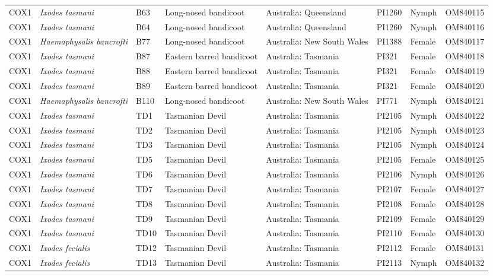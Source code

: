 \documentclass[a4paper, nobind]{templates/ociamthesis}
\begin{document}
\begin{landscape}
\begin{longtable}[t]{l>{}lllllll}
COX1 & \em{Ixodes tasmani} & B63 & Long-nosed bandicoot & Australia: Queensland & PI1260 & Nymph & OM840115\\
COX1 & \em{Ixodes tasmani} & B64 & Long-nosed bandicoot & Australia: Queensland & PI1260 & Nymph & OM840116\\
COX1 & \em{Haemaphysalis bancrofti} & B77 & Long-nosed bandicoot & Australia: New South Wales & PI1388 & Female & OM840117\\
COX1 & \em{Ixodes tasmani} & B87 & Eastern barred bandicoot & Australia: Tasmania & PI321 & Female & OM840118\\
COX1 & \em{Ixodes tasmani} & B88 & Eastern barred bandicoot & Australia: Tasmania & PI321 & Female & OM840119\\
COX1 & \em{Ixodes tasmani} & B89 & Eastern barred bandicoot & Australia: Tasmania & PI321 & Female & OM840120\\
COX1 & \em{Haemaphysalis bancrofti} & B110 & Long-nosed bandicoot & Australia: New South Wales & PI771 & Nymph & OM840121\\
COX1 & \em{Ixodes tasmani} & TD1 & Tasmanian Devil & Australia: Tasmania & PI2105 & Nymph & OM840122\\
COX1 & \em{Ixodes tasmani} & TD2 & Tasmanian Devil & Australia: Tasmania & PI2105 & Nymph & OM840123\\
COX1 & \em{Ixodes tasmani} & TD3 & Tasmanian Devil & Australia: Tasmania & PI2105 & Nymph & OM840124\\
COX1 & \em{Ixodes tasmani} & TD5 & Tasmanian Devil & Australia: Tasmania & PI2105 & Female & OM840125\\
COX1 & \em{Ixodes tasmani} & TD6 & Tasmanian Devil & Australia: Tasmania & PI2106 & Nymph & OM840126\\
COX1 & \em{Ixodes tasmani} & TD7 & Tasmanian Devil & Australia: Tasmania & PI2107 & Female & OM840127\\
COX1 & \em{Ixodes tasmani} & TD8 & Tasmanian Devil & Australia: Tasmania & PI2108 & Female & OM840128\\
COX1 & \em{Ixodes tasmani} & TD9 & Tasmanian Devil & Australia: Tasmania & PI2109 & Female & OM840129\\
COX1 & \em{Ixodes tasmani} & TD10 & Tasmanian Devil & Australia: Tasmania & PI2110 & Female & OM840130\\
COX1 & \em{Ixodes fecialis} & TD12 & Tasmanian Devil & Australia: Tasmania & PI2112 & Female & OM840131\\
COX1 & \em{Ixodes fecialis} & TD13 & Tasmanian Devil & Australia: Tasmania & PI2113 & Nymph & OM840132\\

\end{longtable}
\end{landscape}
\end{document}
